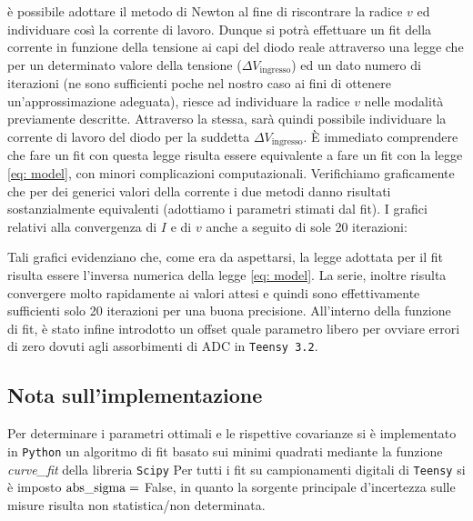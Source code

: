 \documentclass{article}[a4paper, oneside, 11pt]
\begin{document}
\`e possibile adottare il metodo di Newton al fine di riscontrare la radice $v$
ed individuare cos\`i la corrente di lavoro. 
Dunque si potr\`a effettuare un fit della corrente in funzione della tensione ai 
capi del diodo reale attraverso una legge che per un determinato valore della 
tensione ($\Delta V_{\text{ingresso}}$) ed un dato numero di iterazioni (ne 
sono sufficienti poche nel nostro caso ai fini di ottenere un’approssimazione 
adeguata), riesce ad individuare la radice $v$ nelle modalit\`a previamente 
descritte. Attraverso la stessa, sar\`a quindi possibile individuare la corrente 
di lavoro del diodo per la suddetta $\Delta V_{\text{ingresso}}$. 
\`E immediato comprendere che fare un fit con questa legge risulta essere 
equivalente a fare un fit con la legge \eqref{eq: model}, con minori complicazioni 
computazionali. Verifichiamo graficamente che per dei generici valori della 
corrente i due metodi danno risultati sostanzialmente equivalenti (adottiamo i 
parametri stimati dal fit). I grafici relativi alla convergenza di $I$ e di $v$ 
anche a seguito di sole 20 iterazioni:
\begin{figure}[H]
	\centering 
	\def\svgwidth{\columnwidth}
		\scalebox{0.75}{}
\end{figure}
\begin{figure}[H]
	\centering 
		\scalebox{0.75}{}
\end{figure}
Tali grafici evidenziano che, come era da aspettarsi, la legge adottata per il 
fit risulta essere l’inversa numerica della legge \eqref{eq: model}. La serie,
inoltre risulta convergere molto rapidamente ai valori attesi e quindi sono 
effettivamente sufficienti solo 20 iterazioni per una buona precisione.
All’interno della funzione di fit, \`e stato infine introdotto un offset quale
parametro libero per ovviare errori di zero dovuti agli assorbimenti di ADC
in \verb+Teensy 3.2+.

\subsection*{Nota sull'implementazione}
Per determinare i parametri ottimali e le rispettive covarianze si \`e
implementato in \verb+Python+ un algoritmo di fit basato sui minimi quadrati
mediante la funzione \emph{curve\_fit} della libreria \texttt{Scipy}\cite{scipy}
Per tutti i fit su campionamenti digitali di \verb+Teensy+ si \`e imposto
$\rm{abs\_sigma} =$ False, in quanto la sorgente principale d'incertezza
sulle misure risulta non statistica/non determinata.


\medskip


\end{document}
